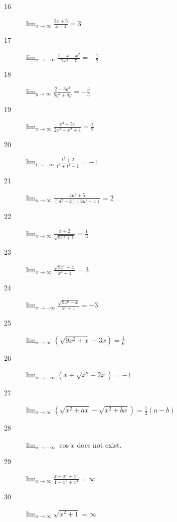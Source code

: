 \documentclass[letterpaper]{exam}
\begin{document}
\begin{description}
      \item[16] 
        $\lim_{x \to \infty} \frac{3x + 5}{x - 4} = \boxed{ 3 }$

      \item[17] 
        $\lim_{x \to -\infty} \frac{1 - x - x^2}{2x^2 - 7} = \boxed{ - \frac{1}{2} }$

      \item[18] 
        $\lim_{y \to \infty} \frac{2 - 3y^2}{5y^2 + 4y} = \boxed{ - \frac{3}{5} }$

      \item[19] 
        $\lim_{x \to \infty} \frac{x^3 + 5x}{2x^3 - x^2 + 4} = \boxed{ \frac{1}{2} }$

      \item[20] 
        $\lim_{t \to -\infty} \frac{t^2 + 2}{t^3 + t^2 - 1} = \boxed{ -1 }$

      \item[21] 
        $\lim_{u \to \infty} \frac{4u^4 + 5}{\left(u^2 - 2 \right) \left(2u^2 - 1 \right)} 
          = \boxed{ 2 }$

      \item[22] 
        $\lim_{x \to \infty} \frac{x + 2}{\sqrt{9x^2 + 1}} = \boxed{ \frac{1}{3} }$

      \item[23] 
        $\lim_{x \to \infty} \frac{\sqrt{9x^6 - x}}{x^3 + 1} = \boxed{ 3 }$

      \item[24] 
        $\lim_{x \to -\infty} \frac{\sqrt{9x^6 - x}}{x^3 + 1} = \boxed{ -3 }$

      \item[25] 
        $\lim_{x \to \infty} \left( \sqrt{9x^2 + x} - 3x \right) 
          = \boxed{ \frac{1}{6} }$

      \item[26] 
        $\lim_{x \to -\infty} \left( x + \sqrt{x^2 + 2x} \right) = \boxed{ -1 }$

      \item[27] 
        $\lim_{x \to \infty} \left( \sqrt{x^2 + ax} - \sqrt{x^2 + bx} \right) 
          = \boxed{ \frac{1}{2} (a - b) }$

      \item[28] 
        $\lim_{x \to -\infty} \cos x$ does not exist.

      \item[29] 
        $\lim_{x \to \infty} \frac{x + x^3 + x^5}{1 - x^2 + x^4} = \boxed{ \infty }$

      \item[30] 
        $\lim_{x \to \infty} \sqrt{x^2 + 1} = \boxed{ \infty }$


\end{description}
\end{document}
